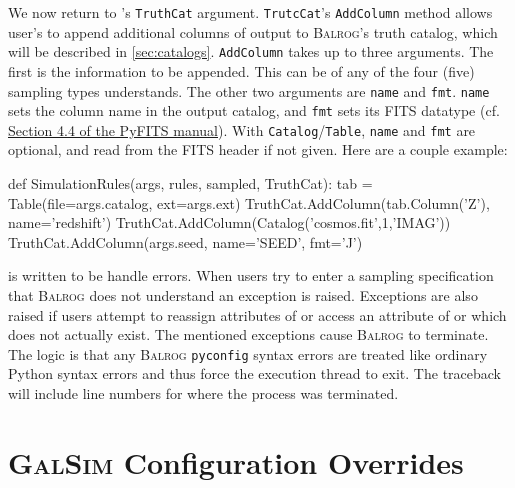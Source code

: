 \documentclass[11pt]{book}
\newcommand{\codett}[1]{\lstinline{#1}}
\newcommand{\py}{Python}
\newcommand{\pyconfig}{\codett{pyconfig}}
\newcommand{\galsim}{\textsc{GalSim}}
\newcommand{\balrog}{\textsc{Balrog}}
\newcommand{\cf}{cf.}
\begin{document}
\hypertarget{hyper:addtruth}{}
We now return to \simfunc{}'s \codett{TruthCat} argument.
\codett{TrutcCat}'s \codett{AddColumn} method allows user's to append additional columns of output
to \balrog{}'s truth catalog, which will be described in \autoref{sec:catalogs}.
\codett{AddColumn} takes up to three arguments.
The first is the information to be appended. This can be of any of the four (five) sampling types \simrules{} understands.
The other two arguments are \codett{name} and \codett{fmt}.
\codett{name} sets the column name in the output catalog, and \codett{fmt} sets its FITS datatype 
(\cf{} \href{http://www.ast.uct.ac.za/~ims/teaching/comp\_astron/python\_manuals/pyfits\_manual.pdf}{Section 4.4 of the PyFITS manual}).
With \codett{Catalog}/\codett{Table}, \codett{name} and \codett{fmt} are optional, and read from the FITS header if not given.
Here are a couple example:
\begin{code}
def SimulationRules(args, rules, sampled, TruthCat):
    tab = Table(file=args.catalog, ext=args.ext)
    TruthCat.AddColumn(tab.Column('Z'), name='redshift')
    TruthCat.AddColumn(Catalog('cosmos.fit',1,'IMAG'))
    TruthCat.AddColumn(args.seed, name='SEED', fmt='J')
\end{code}

\simfunc{} is written to be handle errors.
When users try to enter a sampling specification that \balrog{} does not understand an exception is raised.
Exceptions are also raised if users attempt to reassign attributes of \simsamp{} or 
access an attribute of \simrules{} or \simsamp{} which does not actually exist.
The mentioned exceptions cause \balrog{} to terminate.
The logic is that any \balrog{} \pyconfig{} syntax errors are treated like ordinary \py{} syntax
errors and thus force the execution thread to exit.
The traceback will include line numbers for where the process was terminated.


\section{\galsim{} Configuration Overrides}
\label{sec:gsparams}
\end{document}
